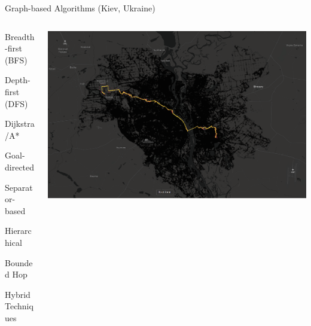 \documentclass[aspectratio=169]{beamer}
\makeatletter
\renewcommand{\red}[1]{{\color{pureminimalistic@text@red} #1}}
\makeatother
\begin{document}
\begin{frame}[plain]{Graph-based Algorithms (Kiev, Ukraine)}
  \begin{columns}[T]
      \begin{column}{.4\linewidth}
          \begin{vfilleditems}
              \item {\Large Breadth-first (BFS)}
              \item {\Large Depth-first (DFS)}
              \item {\Large Dijkstra/A*}
              \vspace{1em}
              {\color{grey}
              \item {\Large Goal-directed}
              \item {\Large Separator-based}
              \item {\Large Hierarchical}
              \item {\Large Bounded Hop}
              \item {\Large Hybrid Techniques}
              \vspace{1em}
              }
              \item \red{\Large \cite{bast2016route}}
          \end{vfilleditems}
      \end{column}
      \begin{column}{.6\linewidth}
      \includegraphics[height=0.9\textheight, keepaspectratio, trim={5cm 3cm 12cm 2cm}, clip]{figures/kiev.png}
      \end{column}
  \end{columns}
\end{frame}
\end{document}
